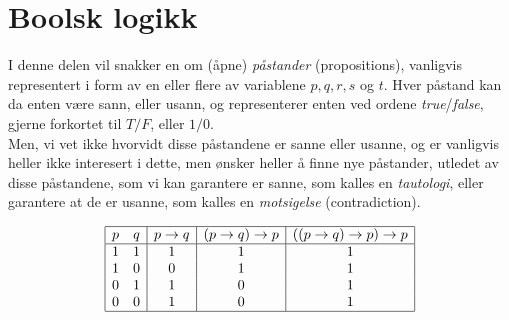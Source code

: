 \section{Boolsk logikk}

I denne delen vil snakker en om (åpne) \textit{påstander} (propositions),
vanligvis representert i form av en eller flere av variablene $p, q, r, s$ og $t$.
Hver påstand kan da enten være sann, eller usann, og representerer enten ved ordene \textit{true}/\textit{false},
gjerne forkortet til $T/F$, eller $1/0$.\\
Men, vi vet ikke hvorvidt disse påstandene er sanne eller usanne, og er vanligvis heller ikke interesert i dette,
men ønsker heller å finne nye påstander, utledet av disse påstandene, som vi kan garantere er sanne, som kalles en \textit{tautologi},
eller garantere at de er usanne, som kalles en \textit{motsigelse} (contradiction).


\begin{displaymath}
    \begin{array}{|c c|c|c|c|}
        \hline
        p & q & p \to q & (p \to q) \to p & ((p \to q) \to p) \to p\\
        \hline
        1 & 1 & 1 & 1 & 1\\
        1 & 0 & 0 & 1 & 1\\
        0 & 1 & 1 & 0 & 1\\
        0 & 0 & 1 & 0 & 1\\
        \hline
    \end{array}
\end{displaymath}